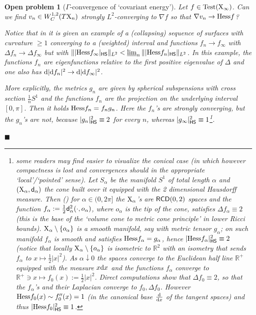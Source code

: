 \documentclass[11pt]{article}
\numberwithin{equation}{section}
\newtheorem{open}[theorem]{Open problem}
\newcommand{\R}{\mathbb{R}}
\newcommand{\X}{{\rm X}}
\newcommand{\sfd}{{\sf d}}
\newcommand{\RCD}{{\sf RCD}}
\renewcommand{\d}{{\rm d}}
\newcommand{\limi}{\varliminf}
\newcommand{\fr}{\penalty-20\null\hfill$\blacksquare$}         %
\newcommand{\HS}{\sf HS}
\newcommand{\test}{{\rm Test}}
\begin{document}
\begin{open}[$\Gamma$-convergence of `covariant energy']{\rm
Let $f\in \test(\X_\infty)$. Can we find $v_n\in W^{1,2}_C(T\X_n)$ strongly $L^2$-converging to $\nabla f$ so that  $\nabla v_n\to{\rm Hess}f$? 

Notice that in \cite[Remark 1.10.6]{AH16} it is given an example of a (collapsing) sequence of surfaces with  curvature $\geq1$ converging to a (weighted) interval and functions $f_n\to f_\infty$ with $\Delta f_n\to\Delta f_\infty$ but with $\||{\rm Hess}f_\infty|_{\HS}\|_{L^2}<\limi_n\||{\rm Hess}f_n|_{\HS}\|_{L^2}$. In this example, the functions $f_n$ are eigenfunctions relative to the  first positive eigenvalue of $\Delta$ and one also has $\d|\d f_n|^2\to\d|\d f_\infty|^2$.

More explicitly, the metrics $g_n$ are given by spherical subspensions with cross section $\tfrac1nS^1$ and the functions $f_n$ are the projection on the underlying interval $[0,\pi]$. Then  it holds ${\rm Hess}f_n=f_ng_n$. Here the $f_n$'s are strongly converging, but the $g_n$'s are not, because $|g_n|_{\HS}^2\equiv2$ for every $n$, whereas $|g_\infty|_{\HS}^2\equiv1$\footnote{some readers may find easier to visualize the conical case (in which however compactness is lost and convergences should  in the appropriate `local'/`pointed' sense). Let $S_\alpha$ be the manifold $S^1$ of total length $\alpha$ and $(\X_\alpha,\sfd_\alpha)$ the cone built over it equipped with the 2 dimensional Hausdorff measure. Then (\cite{Ketterer13}) for $\alpha\in(0,2\pi]$ the $\X_\alpha$'s are $\RCD(0,2)$ spaces and the function $f_\alpha:=\tfrac12\sfd_\alpha^2(\cdot,o_\alpha)$, where $o_\alpha$ is the tip of the cone, satisfies $\Delta f_\alpha\equiv 2$ (this is the base  of the `volume cone to metric cone principle' in lower Ricci bounds). $\X_\alpha\setminus\{o_\alpha\}$ is a smooth manifold, say  with metric tensor $g_\alpha$; on such manifold $f_\alpha$ is smooth and satisfies ${\rm Hess}f_\alpha=g_\alpha$, hence $|{\rm Hess}f_\alpha|^2_{\HS}\equiv 2$ (notice that locally $\X_\alpha\setminus\{o_\alpha\}$ is  isometric to $\R^2$ with an isometry that sends $f_\alpha$ to $x\mapsto\frac12|x|^2$). As $\alpha\downarrow0$ the spaces converge to the Euclidean half line $\R^+$ equipped with the measure $x\d x$ and the functions $f_\alpha$ converge to $\R^+\ni x\mapsto f_0(x):=\frac12|x|^2$. Direct computations show that $\Delta f_0\equiv 2$, so that the $f_\alpha$'s and their Laplacian converge to $f_0,\Delta f_0$. However ${\rm Hess}f_0(x)\sim f''_0(x)=1$ (in the canonical base $\frac\d{\d x}$ of the tangent spaces) and thus $|{\rm Hess}f_0|_{\HS}^2\equiv 1$.}. 
}\fr
\end{open}
\end{document}

